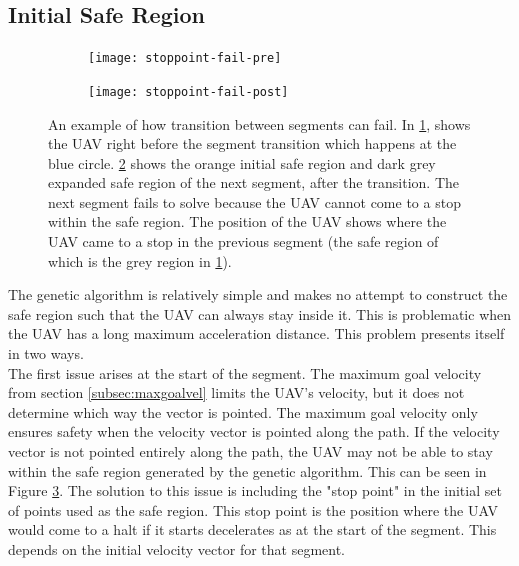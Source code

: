 \subsection{Initial Safe Region}
\label{subsec:safe-ext}
\begin{figure}
	\centering
	\begin{subfigure}[t]{0.35\columnwidth}
        		\texttt{[image: stoppoint-fail-pre]}
        		\caption{}
        		\label{fig:stoppoint-fail-pre}
	\end{subfigure}
	\hfill
	\begin{subfigure}[t]{0.35\columnwidth}
        		\texttt{[image: stoppoint-fail-post]}
        		\caption{}
        		 \label{fig:stoppoint-fail-post}
	\end{subfigure}		
	\caption{An example of how transition between segments can fail. In \ref{fig:stoppoint-fail-pre}, shows the UAV right before the segment transition which happens at the blue circle. \ref{fig:stoppoint-fail-post} shows the orange initial safe region and dark grey expanded safe region of the next segment, after the transition. The next segment fails to solve because the UAV cannot come to a stop within the safe region. The position of the UAV shows where the UAV came to a stop in the previous segment (the safe region of which is the grey region in \ref{fig:stoppoint-fail-pre}).}
    \label{fig:stoppoint-fail}     
\end{figure}

The genetic algorithm is relatively simple and makes no attempt to construct the safe region such that the UAV can always stay inside it. This is problematic when the UAV has a long maximum acceleration distance. This problem presents itself in two ways.\\
The first issue arises at the start of the segment. The maximum goal velocity from section \ref{subsec:maxgoalvel} limits the UAV's velocity, but it does not determine which way the vector is pointed. The maximum goal velocity only ensures safety when the velocity vector is pointed along the path. If the velocity vector is not pointed entirely along the path, the UAV may not be able to stay within the safe region generated by the genetic algorithm. This can be seen in Figure \ref{fig:stoppoint-fail}. The solution to this issue is including the "stop point" in the initial set of points used as the safe region. This stop point is the position where the UAV would come to a halt if it starts decelerates as at the start of the segment. This depends on the initial velocity vector for that segment.\\



